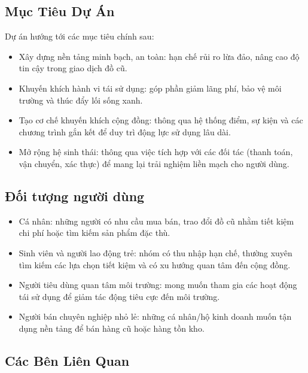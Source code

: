 \documentclass{article}
\begin{document}
\subsection{Mục Tiêu Dự Án}
Dự án hướng tới các mục tiêu chính sau:
\begin{itemize}
    \item Xây dựng nền tảng minh bạch, an toàn: hạn chế rủi ro lừa đảo, nâng cao độ tin cậy trong giao dịch đồ cũ.
    \item Khuyến khích hành vi tái sử dụng: góp phần giảm lãng phí, bảo vệ môi trường và thúc đẩy lối sống xanh.
    \item Tạo cơ chế khuyến khích cộng đồng: thông qua hệ thống điểm, sự kiện và các chương trình gắn kết để duy trì động lực sử dụng lâu dài.
    \item Mở rộng hệ sinh thái: thông qua việc tích hợp với các đối tác (thanh toán, vận chuyển, xác thực) để mang lại trải nghiệm liền mạch cho người dùng.  
\end{itemize}

\subsection{Đối tượng người dùng}

\begin{itemize}
    \item Cá nhân: những người có nhu cầu mua bán, trao đổi đồ cũ nhằm tiết kiệm chi phí hoặc tìm kiếm sản phẩm đặc thù.
    \item Sinh viên và người lao động trẻ: nhóm có thu nhập hạn chế, thường xuyên tìm kiếm các lựa chọn tiết kiệm và có xu hướng quan tâm đến cộng đồng.

    \item Người tiêu dùng quan tâm môi trường: mong muốn tham gia các hoạt động tái sử dụng để giảm tác động tiêu cực đến môi trường.
    \item Người bán chuyên nghiệp nhỏ lẻ: những cá nhân/hộ kinh doanh muốn tận dụng nền tảng để bán hàng cũ hoặc hàng tồn kho.
\end{itemize}

\subsection{Các Bên Liên Quan}
\end{document}
